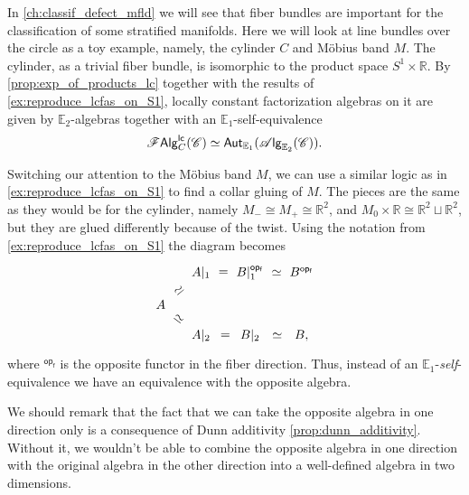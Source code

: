 \documentclass[../text]{subfiles}
\begin{document}
\begin{example}
    In \cref{ch:classif_defect_mfld} we will see that fiber bundles are important for the classification of some stratified manifolds. Here we will look at line bundles over the circle as a toy example, namely, the cylinder $C$ and M\"obius band $M$. The cylinder, as a trivial fiber bundle, is isomorphic to the product space $S^1 \times \mathbb{R}$. By \cref{prop:exp_of_products_lc} together with the results of \cref{ex:reproduce_lcfas_on_S1}, locally constant factorization algebras on it are given by $\mathbb{E}_2$-algebras together with an $\mathbb{E}_1$-self-equivalence
    \begin{align}
        \mathscr{F} \mathsf{Alg}^{\mathsf{lc}}_C (\mathscr{C}) \simeq \mathsf{Aut}_{\mathbb{E}_1} (\mathscr{A} \mathsf{lg}_{\mathbb{E}_2} (\mathscr{C})).
    \end{align}

    Switching our attention to the M\"obius band $M$, we can use a similar logic as in \cref{ex:reproduce_lcfas_on_S1} to find a collar gluing of $M$. The pieces are the same as they would be for the cylinder, namely $M_- \cong M_+ \cong \mathbb{R}^2$, and $M_0 \times \mathbb{R} \cong \mathbb{R}^2 \sqcup \mathbb{R}^2$, but they are glued differently because of the twist. Using the notation from \cref{ex:reproduce_lcfas_on_S1} the diagram becomes
    \begin{equation}
        \begin{tikzcd}[row sep = small, column sep= small]
            & A|_1 \arrow[r, phantom, "=", description] & B|_1^{\mathsf{op_f}} \arrow[r, phantom, "\simeq", description] & B^{\mathsf{op_f}} \\
            A \arrow[ru, phantom, "\simeq", sloped, description] \arrow[rd, phantom, "\simeq", sloped, description] & & & \\
            & A|_2 \arrow[r, phantom, "=", description] & B|_2 \arrow[r, phantom, "\simeq", description] & B,
        \end{tikzcd}
    \end{equation}
    where $^{\mathsf{op_f}}$ is the opposite functor in the fiber direction. Thus, instead of an $\mathbb{E}_1$-\emph{self}-equivalence we have an equivalence with the opposite algebra.

    We should remark that the fact that we can take the opposite algebra in one direction only is a consequence of Dunn additivity \cref{prop:dunn_additivity}. Without it, we wouldn't be able to combine the opposite algebra in one direction with the original algebra in the other direction into a well-defined algebra in two dimensions.
\end{example}
\end{document}
